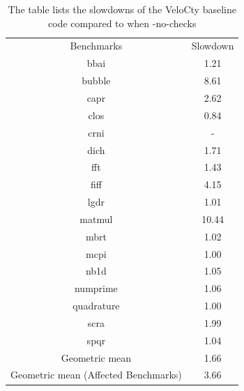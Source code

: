 \begin{table}[htbp]
\centering
\begin{tabular}{|c|c|}
\hline
Benchmarks                           & Slowdown     \\ \hhline{|=|=|}
bbai                                 & 1.21  \\ \hline
bubble                               & 8.61  \\ \hline
capr                                 & 2.62   \\ \hline
clos                                 & 0.84 \\ \hline
crni                                 & -            \\ \hline
dich                                 & 1.71\\ \hline
fft                                  & 1.43\\ \hline
fiff                                 & 4.15\\ \hline
lgdr                                 & 1.01\\ \hline
matmul                               & 10.44\\ \hline
mbrt                                 & 1.02\\ \hline
mcpi                                 & 1.00\\ \hline
nb1d                                 & 1.05\\ \hline
numprime                             & 1.06\\ \hline
quadrature                           & 1.00\\ \hline
scra                                 & 1.99\\ \hline
spqr                                 & 1.04\\ \hline
Geometric mean                       & 1.66\\ \hline
Geometric mean (Affected Benchmarks) & 3.66\\ \hline
\end{tabular}
\caption[Slowdown of \velocty with checks enabled]{The table lists the slowdowns of the  VeloCty baseline code  compared to when \velocty-no-checks}
\label{tab:CwovsCw}
\end{table}
